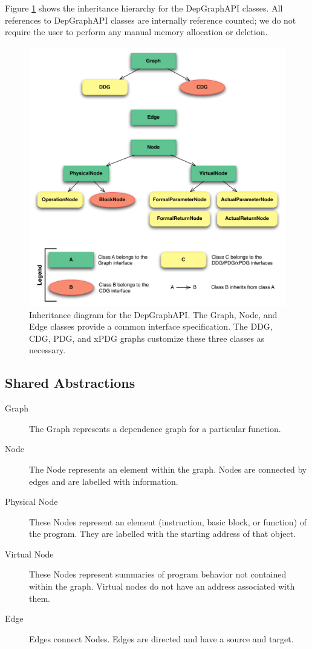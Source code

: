 \documentclass[12pt,titlepage]{article}
\begin{document}
Figure \ref{inheritance} shows the
inheritance hierarchy for the DepGraphAPI classes. All references to
DepGraphAPI classes are internally reference counted; we do not
require the user to perform any manual memory allocation or deletion.

\begin{figure}
\begin{center}
\includegraphics[scale=0.75]{figs/Inheritance.pdf}
\caption{Inheritance diagram for the DepGraphAPI. The Graph, Node, and
  Edge classes provide a common interface specification. The DDG, CDG,
  PDG, and xPDG graphs customize these three classes as necessary.}
\end{center}
\label{inheritance}
\end{figure}

\subsection{Shared Abstractions}

\begin{description}
\item[Graph] The Graph represents a dependence graph for a particular
function.
\item[Node] The Node represents an element within the graph. Nodes are
connected by edges and are labelled with information.
\item[Physical Node] These Nodes represent an element (instruction, basic
block, or function) of the program. They are labelled with the starting address
of that object.
\item[Virtual Node] These Nodes represent summaries of program
behavior not contained within the graph. Virtual nodes do not have an
address associated with them.
\item[Edge] Edges connect Nodes. Edges are directed and have a source
and target.
\end{description}
\end{document}
